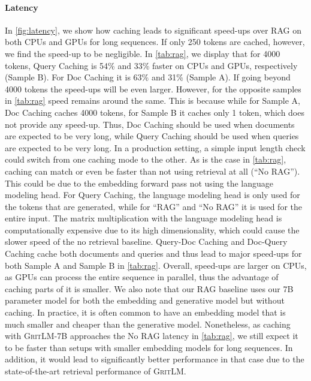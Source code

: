 \documentclass{article}
\newcommand{\model}{\textsc{GritLM}}
\begin{document}
\paragraph{Latency} In \autoref{fig:latency}, we show how caching leads to significant speed-ups over RAG on both CPUs and GPUs for long sequences. If only 250 tokens are cached, however, we find the speed-up to be negligible. In \autoref{tab:rag}, we display that for 4000 tokens, Query Caching is 54\% and 33\% faster on CPUs and GPUs, respectively (Sample B). For Doc Caching it is 63\% and 31\% (Sample A). If going beyond 4000 tokens the speed-ups will be even larger. However, for the opposite samples in \autoref{tab:rag} speed remains around the same. This is because while for Sample A, Doc Caching caches 4000 tokens, for Sample B it caches only 1 token, which does not provide any speed-up. Thus, Doc Caching should be used when documents are expected to be very long, while Query Caching should be used when queries are expected to be very long. In a production setting, a simple input length check could switch from one caching mode to the other. As is the case in  \autoref{tab:rag}, caching can match or even be faster than not using retrieval at all (``No RAG''). This could be due to the embedding forward pass not using the language modeling head. For Query Caching, the language modeling head is only used for the tokens that are generated, while for ``RAG'' and ``No RAG'' it is used for the entire input. The matrix multiplication with the language modeling head is computationally expensive due to its high dimensionality, which could cause the slower speed of the no retrieval baseline. Query-Doc Caching and Doc-Query Caching cache both documents and queries and thus lead to major speed-ups for both Sample A and Sample B in \autoref{tab:rag}. Overall, speed-ups are larger on CPUs, as GPUs can process the entire sequence in parallel, thus the advantage of caching parts of it is smaller. We also note that our RAG baseline uses our 7B parameter model for both the embedding and generative model but without caching. In practice, it is often common to have an embedding model that is much smaller and cheaper than the generative model. Nonetheless, as caching with \model{}-7B approaches the No RAG latency in \autoref{tab:rag}, we still expect it to be faster than setups with smaller embedding models for long sequences. In addition, it would lead to significantly better performance in that case due to the state-of-the-art retrieval performance of \model{}.
\end{document}
